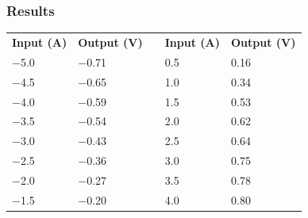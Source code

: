 \subsubsection{Results}

\begin{table}[H]
\centering
\begin{tabular}{|l|l|l| l|l|}
\cline{1-2}\cline{4-5}%
  \textbf{Input (A)}   & \textbf{Output (V)} &\phantom{hey}& \textbf{Input (A)}   & \textbf{Output (V)}\\
\cline{1-2}\cline{4-5}%
  \SI{-5,0}{}          &       \SI{-0,71}{}  &             & \SI{0,5}{}           & \SI{0,16}{}        \\
\cline{1-2}\cline{4-5}%
  \SI{-4,5}{}          &       \SI{-0,65}{}  &             & \SI{1,0}{}           & \SI{0,34}{}        \\
\cline{1-2}\cline{4-5}%
  \SI{-4,0}{}          &       \SI{-0,59}{}  &             & \SI{1,5}{}           & \SI{0,53}{}        \\
\cline{1-2}\cline{4-5}%
  \SI{-3,5}{}          &       \SI{-0,54}{}  &             & \SI{2,0}{}           & \SI{0,62}{}        \\
\cline{1-2}\cline{4-5}%
  \SI{-3,0}{}          &       \SI{-0,43}{}  &             & \SI{2,5}{}           & \SI{0,64}{}        \\
\cline{1-2}\cline{4-5}%
  \SI{-2,5}{}          &       \SI{-0,36}{}  &             & \SI{3,0}{}           & \SI{0,75}{}        \\
\cline{1-2}\cline{4-5}%
  \SI{-2,0}{}          &       \SI{-0,27}{}  &             & \SI{3,5}{}           & \SI{0,78}{}        \\
\cline{1-2}\cline{4-5}%
  \SI{-1,5}{}          &       \SI{-0,20}{}  &             & \SI{4,0}{}           & \SI{0,80}{}        \\

\end{tabular}
\end{table}
